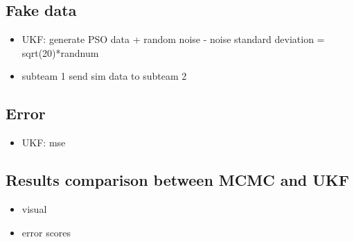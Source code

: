 \documentclass{article}
\begin{document}
\subsection{Fake data}
\begin{itemize}
    \item UKF: generate PSO data + random noise - noise standard deviation = sqrt(20)*randnum
    \item subteam 1 send sim data to subteam 2
\end{itemize}
\subsection{Error}
\begin{itemize}
    \item UKF: mse
\end{itemize}
\subsection{Results comparison between MCMC and UKF}
\begin{itemize}
    \item visual
    \item error scores
\end{itemize}
\end{document}
